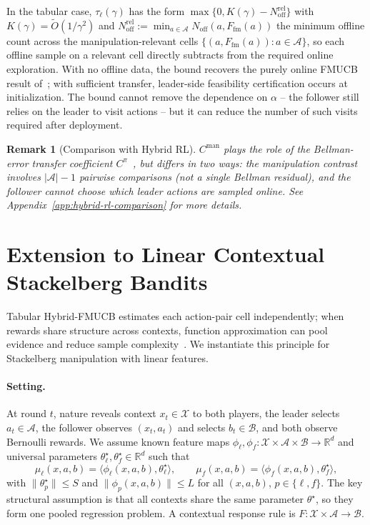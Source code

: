 \documentclass{article}
\newcommand{\cA}{\mathcal{A}}
\newcommand{\cX}{\mathcal{X}}
\newcommand{\cB}{\mathcal{B}}
\newcommand{\R}{\mathbb{R}}
\newtheorem{remark}[theorem]{Remark}
\begin{document}
In the tabular case, $\tau_\ell(\gamma)$ has the form $\max\{0,K(\gamma)-N_{\mathrm{off}}^{\mathrm{rel}}\}$ with $K(\gamma)=\widetilde O(1/\gamma^2)$ and $N_{\mathrm{off}}^{\mathrm{rel}}:=\min_{a\in\cA}N_{\mathrm{off}}(a,F_{\mathrm{fm}}(a))$ the minimum offline count across the manipulation-relevant cells $\{(a,F_{\mathrm{fm}}(a)):a\in\cA\}$, so each offline sample on a relevant cell directly subtracts from the required online exploration. With no offline data, the bound recovers the purely online FMUCB result of~\cite{yu2024decentralized}; with sufficient transfer, leader-side feasibility certification occurs at initialization. The bound cannot remove the dependence on $\alpha$ -- the follower still relies on the leader to visit actions -- but it can reduce the number of such visits required after deployment.

\begin{remark}[Comparison with Hybrid RL]
$C^{\mathrm{man}}$ plays the role of the Bellman-error transfer coefficient $C^\pi$~\cite{song2022hybrid}, but differs in two ways: the manipulation contrast involves $|\cA|-1$ pairwise comparisons (not a single Bellman residual), and the follower cannot choose which leader actions are sampled online. See Appendix~\ref{app:hybrid-rl-comparison} for more details.
\end{remark}

\section{Extension to Linear Contextual Stackelberg Bandits}
\label{sec:contextual-bandit-stackelberg}
Tabular Hybrid-FMUCB estimates each action-pair cell independently; when rewards share structure across contexts, function approximation can pool evidence and reduce sample complexity~\cite{zhu2022contextual}. We instantiate this principle for Stackelberg manipulation with linear features.

\paragraph{Setting.}
At round $t$, nature reveals context $x_t\in\cX$ to both players, the leader selects $a_t\in\cA$, the follower observes $(x_t,a_t)$ and selects $b_t\in\cB$, and both observe Bernoulli rewards. We assume known feature maps $\phi_\ell,\phi_f:\cX\times\cA\times\cB\to\R^d$ and universal parameters $\theta_\ell^\star,\theta_f^\star\in\R^d$ such that
\[
    \mu_\ell(x,a,b)=\langle\phi_\ell(x,a,b),\theta_\ell^\star\rangle,
    \qquad
    \mu_f(x,a,b)=\langle\phi_f(x,a,b),\theta_f^\star\rangle,
\]
with $\|\theta_p^\star\|\le S$ and $\|\phi_p(x,a,b)\|\le L$ for all $(x,a,b)$, $p\in\{\ell,f\}$. The key structural assumption is that all contexts share the same parameter $\theta^\star$, so they form one pooled regression problem. A contextual response rule is $F:\cX\times\cA\to\cB$.
\end{document}
